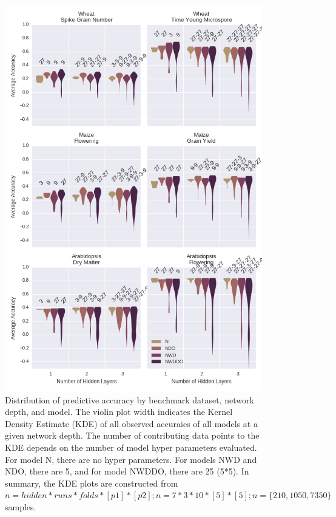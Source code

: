 
\begin{figure}[htbp]
\renewcommand{\familydefault}{\sfdefault}\normalfont
\centering 
\includegraphics[width=\linewidth]{g3_article/figures/depth_comparison.png}
    \caption{Distribution of predictive accuracy by benchmark dataset, network depth, and model.
             The violin plot width indicates the Kernel Density Estimate (KDE) of all observed 
             accuraies of all models at a given network depth. The number of contributing data points
             to the KDE depends on the number of model hyper parameters evaluated. For model N, there 
             are no hyper parameters. For models NWD and NDO, there are 5, and for model NWDDO, there
             are 25 (5*5). In summary, the KDE plots are constructed from
             $n=hidden*runs*folds*[p1]*[p2] ; n=7*3*10*[5]*[5] ; n=\{ 210, 1050, 7350 \}$ samples. 
}
\end{figure}
